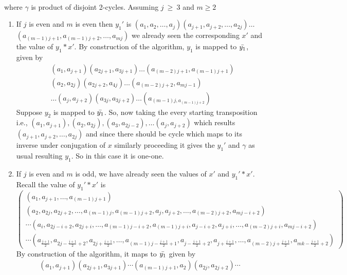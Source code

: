 \documentclass[oneside]{amsart}
\theoremstyle{plain}
\theoremstyle{definition}
\theoremstyle{remark}
\begin{document}
\begin{enumerate}
\begin{align*}
            \end{align*} where $\gamma$ is product of disjoint 2-cycles. Assuming $j\ \geq\ 3$ and $m \geq 2$
            \begin{enumerate}
                \item[Case (2.a)] If $j$ is even and $m$ is even then $y_1'$ is $(a_1, a_2, \ldots, a_j)(a_{j + 1}, a_{j + 2}, \ldots, a_{2j})\ldots$\\ $(a_{(m - 1)j + 1},a_{(m - 1)j + 2}, \ldots, a_{mj})$ we already seen the corresponding $x'$ and the value of $y_1*x'$. By construction of the algorithm, $y_1$ is mapped to $\Bar{y_1}$, given by
                \begin{align*}
                    &(a_1, a_{j + 1})(a_{2j + 1}, a_{3j + 1})\ldots (a_{(m - 2)j + 1}, a_{(m - 1)j + 1})\\
                    &(a_2, a_{2j})(a_{2j + 2}, a_{4j})\ldots (a_{(m - 2)j + 2}, a_{mj - 1})\\
                    & \ldots (a_j, a_{j + 2})(a_{3j}, a_{3j + 2})\ldots (a_{(m - 1)j, a_{(m - 1)j + 2}})
                \end{align*}
                Suppose $y_2$ is mapped to $\Bar{y_1}$.
                So, now taking the every starting transposition i.e., $(a_1, a_{j + 1}), (a_2, a_{2j}), (a_3, a_{2j - 2}), \ldots (a_j, a_{j + 2})$ which results $(a_{j + 1}, a_{j + 2}, \ldots, a_{2j})$ and since there should be cycle which maps to its inverse under conjugation of $x$ similarly proceeding it gives the $y_1'$ and $\gamma$ as usual resulting $y_1$. So in this case it is one-one.
                
                \item[Case (2.b)] If $j$ is even and $m$ is odd, we have already seen the values of $x'$ and $y_1'*x'$. Recall the value of $y_1'*x'$ is
                $$\left(\begin{array}{l}
                    (a_1, a_{j + 1}, \ldots ,a_{(m - 1)j + 1})\\
                    (a_2, a_{2j}, a_{2j + 2}, \ldots, a_{(m - 1)j}, a_{(m - 1)j + 2}, a_{j}, a_{j + 2}, \ldots, a_{(m - 2)j + 2}, a_{mj - i + 2})\\
                    \cdots (a_i, a_{2j - i + 2}, a_{2j + i}, \ldots ,a_{(m - 1)j - i + 2}, a_{(m - 1)j + i}, a_{j - i + 2}, a_{j + i}, \ldots ,a_{(m - 2)j + i}, a_{mj - i + 2})\\
                    \cdots (a_{\frac{j + 1}{2}}, a_{2j - \frac{j + 1}{2} + 2}, a_{2j + \frac{j + 1}{2}}, \ldots, a_{(m - 1)j - \frac{j + 1}{2} + 1}, a_{j - \frac{j + 1}{2} + 2}, a_{j + \frac{j + 1}{2}}, \ldots, a_{(m - 2)j + \frac{j + 1}{2}}, a_{mk - \frac{j + 1}{2} + 2})
                \end{array}\right)$$
                By construction of the algorithm, it maps to $\Bar{y_1}$ given by
                \begin{align*}
                    (a_1, a_{j + 1})(a_{2j + 1}, a_{3j + 1})\cdots(a_{(m - 1)j + 1}, a_2)(a_{2j}, a_{2j + 2})\cdots
                \end{align*}
                

\end{enumerate}
\end{enumerate}
\end{document}
